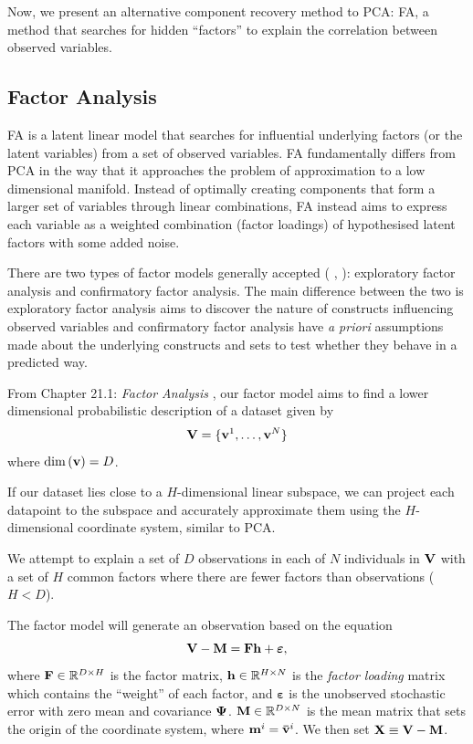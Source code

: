 \documentclass[12pt, letterpaper]{article}
\begin{document}
    Now, we present an alternative component recovery method to PCA: FA, a method that searches for hidden ``factors'' to explain the correlation between observed variables.
    
    \subsection{Factor Analysis}
    
    FA is a latent linear model that searches for influential underlying factors (or the latent variables) from a set of observed variables. FA fundamentally differs from PCA in the way that it approaches the problem of approximation to a low dimensional manifold. Instead of  optimally creating components that form a larger set of variables through linear combinations, FA instead aims to express each variable as a weighted combination (factor loadings) of hypothesised latent factors with some added noise.

    There are two types of factor models generally accepted (\citeauthor{decoster1998overview} \citeyear{decoster1998overview}, \citeauthor{kline2014easy} \citeyear{kline2014easy}): exploratory factor analysis and confirmatory factor analysis. The main difference between the two is exploratory factor analysis aims to discover the nature of constructs influencing observed variables and confirmatory factor analysis have \emph{a priori} assumptions made about the underlying constructs and sets to test whether they behave in a predicted way.

    
    From Chapter 21.1: \emph{Factor Analysis} \citep{barber_2018}, our factor model aims to find a lower dimensional probabilistic description of a dataset given by
    $$\vb{V} = \{\vb{v}^1,\dots,\vb{v}^N\}$$
    where $\dim{(\vb{v})}=D$.
    
    If our dataset lies close to a $H$-dimensional linear subspace, we can project each datapoint to the subspace and accurately approximate them using the $H$-dimensional coordinate system, similar to PCA.
    
    We attempt to explain a set of $D$ observations in each of $N$ individuals in $\vb{V}$ with a set of $H$ common factors where there are fewer factors than observations ($H<D$).
    
    The factor model will generate an observation based on the equation
    $$\vb{V}-\vb{M}=\vb{Fh}+\bm{\varepsilon},$$
    where $\vb{F} \in \mathbb{R}^{D\times H}$ is the factor matrix, $\vb{h}\in \mathbb{R}^{H\times N}$ is the \emph{factor loading} matrix which contains the ``weight'' of each factor, and $\bm{\varepsilon}$ is the unobserved stochastic error with zero mean and covariance $\vb{\Psi}$. $\vb{M}\in\mathbb{R}^{D\times N}$ is the mean matrix that sets the origin of the coordinate system, where $\vb{m}^i=\vb{\Bar{v}}^i$. We then set $\vb{X}\equiv \vb{V}-\vb{M}$.
    
\end{document}
